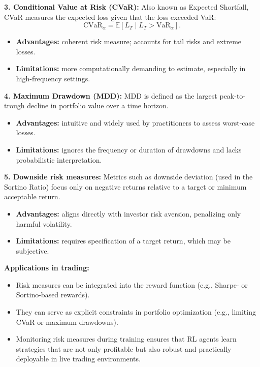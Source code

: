 \documentclass[12pt,a4paper]{report}
\begin{document}
\bigskip
\textbf{3. Conditional Value at Risk (CVaR):}  
Also known as Expected Shortfall, CVaR measures the expected loss given that the loss exceeded VaR:
\[
\text{CVaR}_{\alpha} = \mathbb{E}[L_T \mid L_T > \text{VaR}_{\alpha}].
\]
\begin{itemize}
    \item \textbf{Advantages:} coherent risk measure; accounts for tail risks and extreme losses.
    \item \textbf{Limitations:} more computationally demanding to estimate, especially in high-frequency settings.
\end{itemize}

\bigskip
\textbf{4. Maximum Drawdown (MDD):}  
MDD is defined as the largest peak-to-trough decline in portfolio value over a time horizon.  
\begin{itemize}
    \item \textbf{Advantages:} intuitive and widely used by practitioners to assess worst-case losses.
    \item \textbf{Limitations:} ignores the frequency or duration of drawdowns and lacks probabilistic interpretation.
\end{itemize}

\bigskip
\textbf{5. Downside risk measures:}  
Metrics such as downside deviation (used in the Sortino Ratio) focus only on negative returns relative to a target or minimum acceptable return.  
\begin{itemize}
    \item \textbf{Advantages:} aligns directly with investor risk aversion, penalizing only harmful volatility.
    \item \textbf{Limitations:} requires specification of a target return, which may be subjective.
\end{itemize}

\bigskip
\textbf{Applications in trading:}  
\begin{itemize}
    \item Risk measures can be integrated into the reward function (e.g., Sharpe- or Sortino-based rewards).
    \item They can serve as explicit constraints in portfolio optimization (e.g., limiting CVaR or maximum drawdowns).
    \item Monitoring risk measures during training ensures that RL agents learn strategies that are not only profitable but also robust and practically deployable in live trading environments.
\end{itemize}
\end{document}
